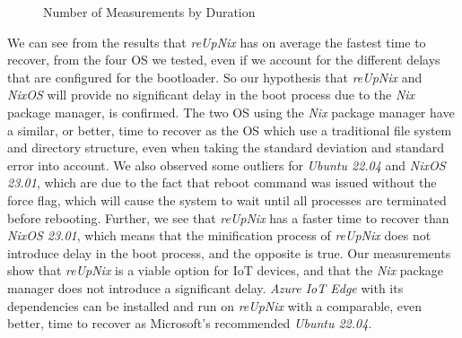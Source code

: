 \begin{figure}[H]
\caption{Number of Measurements by Duration}
\label{fig:timetorecover}
\end{figure}
\noindent
We can see from the results that \textit{reUpNix} has on average the fastest time
to recover, from the four \ac{OS} we tested, even if we account for the different
delays that are configured for the bootloader. So our hypothesis that \textit{reUpNix}
and \textit{NixOS} will provide no significant delay in the boot process due to
the \textit{Nix} package manager, is confirmed. The two \ac{OS} using the
\textit{Nix} package manager have a similar, or better, time to recover as the \ac{OS}
which use a traditional file system and directory structure, even when taking
the standard deviation and standard error into account. We also observed some outliers
for \textit{Ubuntu 22.04} and \textit{NixOS 23.01}, which are due to the
fact that reboot command was issued without the force flag, which will cause
the system to wait until all processes are terminated before rebooting. Further,
we see that \textit{reUpNix} has a faster time to recover than \textit{NixOS 23.01},
which means that the minification process of \textit{reUpNix} does not introduce
delay in the boot process, and the opposite is true.
Our measurements show that \textit{reUpNix} is a viable option for \ac{IoT} devices,
and that the \textit{Nix} package manager does not introduce a significant delay.
\textit{Azure IoT Edge} with its dependencies can be installed and run on
\textit{reUpNix} with a comparable, even better, time to recover as Microsoft's
recommended \textit{Ubuntu 22.04}.


